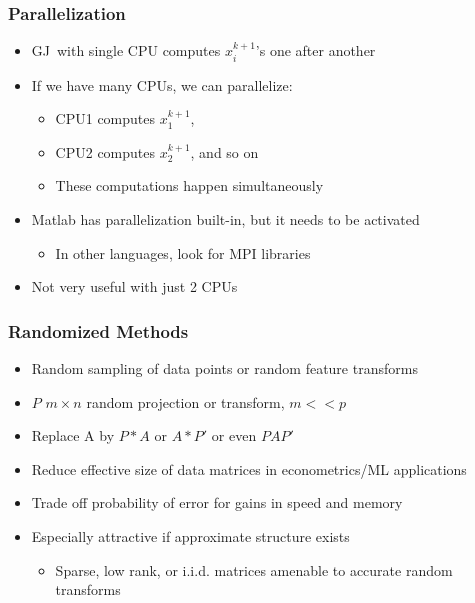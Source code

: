 \documentclass[bigger]{beamer}
\begin{document}
\begin{frame}%
\frametitle{Parallelization}

\begin{itemize}
\item GJ\ with single CPU computes $x_{i}^{k+1}$'s one after another

\item If we have many CPUs, we can parallelize:

\begin{itemize}
\item CPU1 computes $x_{1}^{k+1}$,

\item CPU2 computes $x_{2}^{k+1}$, and so on

\item These computations happen simultaneously
\end{itemize}

\item Matlab has parallelization built-in, but it needs to be activated

\begin{itemize}
\item In other languages, look for MPI libraries
\end{itemize}

\item Not very useful with just 2 CPUs
\end{itemize}


\end{frame}%


\begin{frame}%

\frametitle{Randomized Methods}

\begin{itemize}

\item Random sampling of data points or random feature transforms
\item $P$ $m\times n$ random projection or transform, $m<<p$ 
\item Replace A by $P*A$ or $A*P'$ or even $PAP'$
\item Reduce effective size of data matrices in econometrics/ML applications
\item Trade off probability of error for gains in speed and memory
\item Especially attractive if approximate structure exists
\begin{itemize}
\item Sparse, low rank, or i.i.d. matrices amenable to accurate random transforms
\end{itemize}



\end{itemize}


\end{frame}%
\end{document}
